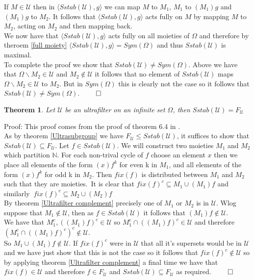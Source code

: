 \documentclass{report}
\newtheorem{theorem}{Theorem}[section]
\begin{document}
If $M \in \mathcal{U}$ then in $\langle Sstab(\mathcal{U}), g \rangle$ 
we can map $M$ to
 $M_1$,
 $M_1$
to $(M_1)g$ and $(M_1)g$ to $M_2$. It follows that $\langle Sstab(\mathcal{U}), g \rangle$ acts fully on $M$ by mapping $M$ to $M_2$, acting on $M_2$ and then mapping back.\\
We now have that $\langle Sstab(\mathcal{U}), g \rangle$ acts fully on all moieties of $\Omega$ and therefore by theroem \ref{full moiety} $\langle Sstab(\mathcal{U}), g \rangle = Sym(\Omega)$ and thus $ Sstab(\mathcal{U})$ is maximal.\\
To complete the proof we show that $Sstab(\mathcal{U}) \neq Sym(\Omega)$. Above we have that $\Omega\backslash M_2 \in \mathcal{U}$ and $M_2 \notin \mathcal{U}$ it follows that no element of $Sstab(\mathcal{U})$ maps $\Omega\backslash M_2 \in \mathcal{U}$ to $M_2$. But in $Sym(\Omega)$ this is clearly not the case so it follows that $Sstab(\mathcal{U}) \neq Sym(\Omega)$. $\qed$
\begin{theorem}\label{ultrastab equiv}
Let $\mathcal{U}$ be an ultrafilter on an infinite set $\Omega$, then $Sstab(\mathcal{U})= F_{\mathcal{U}}$
\end{theorem}\par
Proof: This proof comes from the proof of theorem 6.4 in \cite{ultrafiltermax}.\\
As by theorem \ref{Ultrasubgroup} we have $F_{\mathcal{U}} \leq Sstab(\mathcal{U})$, it suffices to show that $Sstab(\mathcal{U}) \subseteq F_{\mathcal{U}}$.
Let $f \in Sstab(\mathcal{U})$. We will construct two moieties $M_1$ and $M_2$ which partition $\mathbb{N}$. For each non-trival cycle of $f$ choose an element $x$ then we place all elements of the form $(x)f^{k}$ for even k in $M_1$, and all elements of the form $(x)f^{k}$ for odd k in $M_2$. Then $fix(f)$ is distributed between $M_1$ and $M_2$ such that they are moieties.\
It is clear that $ fix(f)^c \subseteq M_1 \cup (M_1)f$ and similarly $\ fix(f)^c \subseteq M_2 \cup (M_2)f$\\
By theorem \ref{Ultrafilter complement} precisely one of $M_1$ or $M_2$ is in $\mathcal{U}$. Wlog suppose that $M_1 \notin \mathcal{U}$, then as $f \in Sstab(\mathcal{U})$ it follows that $(M_1)f \notin \mathcal{U}$.\\
We have that $M_1^c, ((M_1)f)^c \in \mathcal{U}$ so $M_1^c \cap ((M_1)f)^c \in \mathcal{U}$ and therefore $(M_1^c \cap ((M_1)f)^c)^c \notin \mathcal{U}$.\\
So $M_1 \cup (M_1)f \notin \mathcal{U}$. If $fix(f)^c$ were in $\mathcal{U}$ that all it's supersets would be in $\mathcal{U}$ and we have just show that this is not the case so it follows that $fix(f)^c \notin \mathcal{U}$ so by applying theorem \ref{Ultrafilter complement} a final time we have that $fix(f) \in \mathcal{U}$ and therefore $f \in F_{\mathcal{U}}$ and $Sstab(\mathcal{U}) \subseteq F_{\mathcal{U}}$ as required. $\qed$
\end{document}
